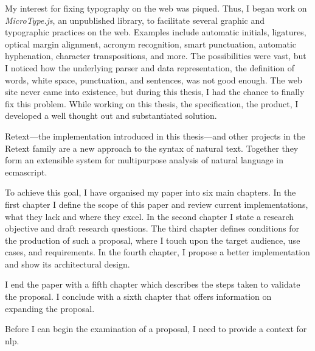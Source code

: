 My interest for fixing typography on the web was piqued.
Thus, I began work on \emph{MicroType.js}, an unpublished library, to
  facilitate several graphic and typographic practices on the web.
Examples include automatic initials, ligatures, optical margin alignment,
  acronym recognition, smart punctuation, automatic hyphenation, character
  transpositions, and more.
The possibilities were vast, but I noticed how the underlying parser and data
  representation, the definition of words, white space, punctuation, and
  sentences, was not good enough.
The web site never came into existence, but during this thesis, I had the
  chance to finally fix this problem.
While working on this thesis, the specification, the product, I developed a
  well thought out and substantiated solution.

Retext---the implementation introduced in this thesis---and other projects
  in the Retext family are a new approach to the syntax of natural text.
Together they form an extensible system for multipurpose analysis of natural
  language in \gls{ecmascript}.

To achieve this goal, I have organised my paper into six main chapters.
In the first chapter I define the scope of this paper and review current
  implementations, what they lack and where they excel.
In the second chapter I state a research objective and draft research
  questions.
The third chapter defines conditions for the production of such a proposal,
  where I touch upon the target audience, use cases, and requirements.
In the fourth chapter, I propose a better implementation and show its
  architectural design.

I end the paper with a fifth chapter which describes the steps taken to
  validate the proposal.
I conclude with a sixth chapter that offers information on expanding the
  proposal.

Before I can begin the examination of a proposal, I need to provide a
  context for \gls{nlp}.

\endgroup

